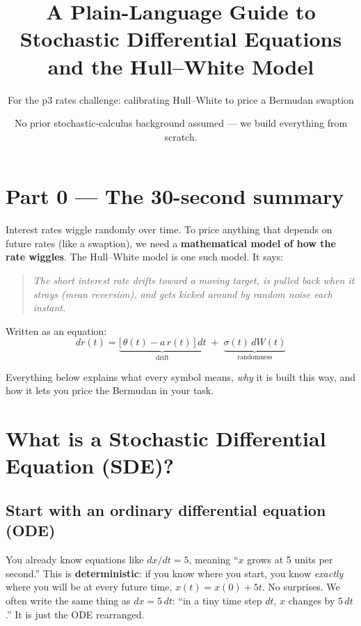 \documentclass[11pt]{article}
\title{\bfseries A Plain-Language Guide to Stochastic Differential Equations \\[2pt] and the Hull--White Model}
\author{For the p3 rates challenge: calibrating Hull--White to price a Bermudan swaption}
\date{No prior stochastic-calculus background assumed --- we build everything from scratch.}
\begin{document}
\maketitle

\section*{Part 0 --- The 30-second summary}

Interest rates wiggle randomly over time. To price anything that depends on future
rates (like a swaption), we need a \textbf{mathematical model of how the rate wiggles}.
The Hull--White model is one such model. It says:

\begin{quote}
\itshape The short interest rate drifts toward a moving target, is pulled back when it
strays (mean reversion), and gets kicked around by random noise each instant.
\end{quote}

Written as an equation:
\[
  dr(t) = \underbrace{\big[\,\theta(t) - a\,r(t)\,\big]\,dt}_{\text{drift}}
        \;+\; \underbrace{\sigma(t)\,dW(t)}_{\text{randomness}}
\]

Everything below explains what every symbol means, \emph{why} it is built this way,
and how it lets you price the Bermudan in your task.

\section{What is a Stochastic Differential Equation (SDE)?}

\subsection{Start with an ordinary differential equation (ODE)}
You already know equations like $dx/dt = 5$, meaning ``$x$ grows at 5 units per
second.'' This is \textbf{deterministic}: if you know where you start, you know
\emph{exactly} where you will be at every future time, $x(t) = x(0) + 5t$. No surprises.
We often write the same thing as $dx = 5\,dt$: ``in a tiny time step $dt$, $x$ changes
by $5\,dt$.'' It is just the ODE rearranged.
\end{document}
